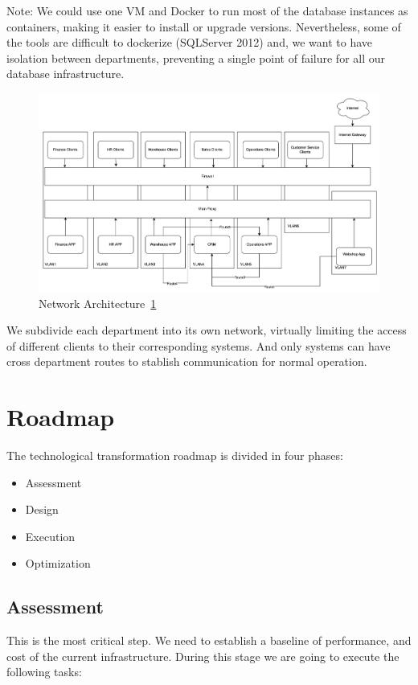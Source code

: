 \documentclass{llncs}
\begin{document}
Note: We could use one VM and Docker to run most of the database instances as containers, making it easier to install or upgrade versions. Nevertheless, some of the tools are difficult to dockerize (SQLServer 2012) and, we want to have isolation between departments, preventing a single point of failure for all our database infrastructure.

\begin{figure}[htbp]
  \begin{center}
    \includegraphics[width=12cm]{diagrams/network_architecture.png}
    \caption{Network Architecture~\ref{Network_Architecture}}
    \label{Network_Architecture} %
  \end{center}
\end{figure}

We subdivide each department into its own network, virtually limiting the access of different clients to their corresponding systems. And only systems can have cross department routes to stablish communication for normal operation. 

\section{Roadmap}

The technological transformation roadmap is divided in four phases:
\begin{itemize}
  \item Assessment
  \item Design
  \item Execution
  \item Optimization
\end{itemize}

\subsection{Assessment}
This is the most critical step. We need to establish a baseline of performance, and cost of the current infrastructure. During this stage we are going to execute the following tasks:
\end{document}
